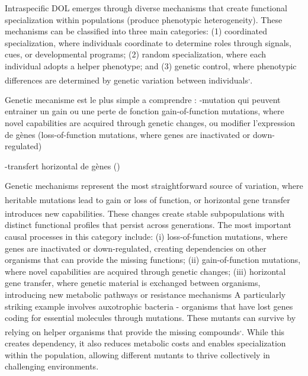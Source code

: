 \documentclass[
  11pt,
  a4paper,
]{report}
\begin{document}
Intraspecific DOL emerges through diverse mechanisms that create
functional specialization within populations (produce phenotypic
heterogeneity). These mechanisms can be classified into three main
categories: (1) coordinated specialization, where individuals coordinate
to determine roles through signals, cues, or developmental programs; (2)
random specialization, where each individual adopts a helper phenotype;
and (3) genetic control, where phenotypic differences are determined by
genetic variation between
individuals\textsuperscript{,}.

Genetic mecanisme est le plus simple a comprendre : -mutation qui
peuvent entrainer un gain ou une perte de fonction gain-of-function
mutations, where novel capabilities are acquired through genetic
changes, ou modifier l'expression de gènes (loss-of-function mutations,
where genes are inactivated or down-regulated)

-transfert horizontal de gènes ()

Genetic mechanisms represent the most straightforward source of
variation, where heritable mutations lead to gain or loss of
function\textsuperscript{}, or horizontal gene
transfer introduces new
capabilities\textsuperscript{}. These
changes create stable subpopulations with distinct functional profiles
that persist across generations. The most important causal processes in
this category include: (i) loss-of-function mutations, where genes are
inactivated or down-regulated, creating dependencies on other organisms
that can provide the missing functions; (ii) gain-of-function mutations,
where novel capabilities are acquired through genetic changes; (iii)
horizontal gene transfer, where genetic material is exchanged between
organisms, introducing new metabolic pathways or resistance mechanisms A
particularly striking example involves auxotrophic bacteria - organisms
that have lost genes coding for essential molecules through mutations.
These mutants can survive by relying on helper organisms that provide
the missing
compounds\textsuperscript{,}.
While this creates dependency, it also reduces metabolic costs and
enables specialization within the population, allowing different mutants
to thrive collectively in challenging environments.
\end{document}
